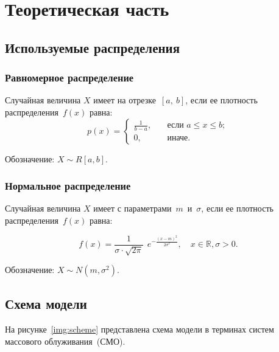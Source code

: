\chapter{Теоретическая часть}

\section{Используемые распределения}

\subsection{Равномерное распределение}
Случайная величина $X$ имеет  на
отрезке~$[a,~b]$, если ее плотность распределения~$f(x)$ равна:
\begin{equation}
    p(x) =
    \begin{cases}
        \displaystyle\frac{1}{b - a}, & \quad \text{если } a \leq x \leq b;\\
        0,  & \quad \text{иначе}.
    \end{cases}
\end{equation}

Обозначение: $X \sim R[a, b]$.


\subsection{Нормальное распределение}

Случайная величина $X$ имеет  с
параметрами~$m$~и~$\sigma$, если ее плотность распределения~$f(x)$ равна:

\begin{equation}
    f(x) = \frac{1}{\sigma \cdot \sqrt{2\pi}}~~e^{\displaystyle-\frac{(x -
    m)^2}{2\sigma^2}}, \quad x \in \mathbb{R}, \sigma > 0.
\end{equation}

Обозначение: $X \sim N(m, \sigma^2)$.

\section{Схема модели}

На рисунке~\ref{img:scheme} представлена схема модели в терминах систем
массового облуживания~(СМО).

